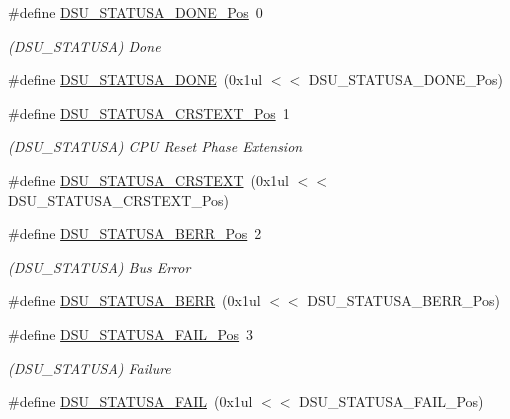\begin{DoxyCompactItemize}
\#define \mbox{\hyperlink{group___s_a_m_d21___d_s_u_ga608007c6aa3ae0221483e370d9ca999b}{D\+S\+U\+\_\+\+S\+T\+A\+T\+U\+S\+A\+\_\+\+D\+O\+N\+E\+\_\+\+Pos}}~0
\begin{DoxyCompactList}\small\item\em (D\+S\+U\+\_\+\+S\+T\+A\+T\+U\+SA) Done \end{DoxyCompactList}\item 
\#define \mbox{\hyperlink{group___s_a_m_d21___d_s_u_ga824b2ff5600830ebc7971da3eeea0b7b}{D\+S\+U\+\_\+\+S\+T\+A\+T\+U\+S\+A\+\_\+\+D\+O\+NE}}~(0x1ul $<$$<$ D\+S\+U\+\_\+\+S\+T\+A\+T\+U\+S\+A\+\_\+\+D\+O\+N\+E\+\_\+\+Pos)
\item 
\#define \mbox{\hyperlink{group___s_a_m_d21___d_s_u_gab5c6d644e1ec7f67cf2a9ad97a5262a2}{D\+S\+U\+\_\+\+S\+T\+A\+T\+U\+S\+A\+\_\+\+C\+R\+S\+T\+E\+X\+T\+\_\+\+Pos}}~1
\begin{DoxyCompactList}\small\item\em (D\+S\+U\+\_\+\+S\+T\+A\+T\+U\+SA) C\+PU Reset Phase Extension \end{DoxyCompactList}\item 
\#define \mbox{\hyperlink{group___s_a_m_d21___d_s_u_ga4ce5d24ab18ad2bf2cc5925d30432907}{D\+S\+U\+\_\+\+S\+T\+A\+T\+U\+S\+A\+\_\+\+C\+R\+S\+T\+E\+XT}}~(0x1ul $<$$<$ D\+S\+U\+\_\+\+S\+T\+A\+T\+U\+S\+A\+\_\+\+C\+R\+S\+T\+E\+X\+T\+\_\+\+Pos)
\item 
\#define \mbox{\hyperlink{group___s_a_m_d21___d_s_u_gafa02b78e838184c6f5a895f0f16c213a}{D\+S\+U\+\_\+\+S\+T\+A\+T\+U\+S\+A\+\_\+\+B\+E\+R\+R\+\_\+\+Pos}}~2
\begin{DoxyCompactList}\small\item\em (D\+S\+U\+\_\+\+S\+T\+A\+T\+U\+SA) Bus Error \end{DoxyCompactList}\item 
\#define \mbox{\hyperlink{group___s_a_m_d21___d_s_u_ga74dbd3779decac8f909b6f2fde2df451}{D\+S\+U\+\_\+\+S\+T\+A\+T\+U\+S\+A\+\_\+\+B\+E\+RR}}~(0x1ul $<$$<$ D\+S\+U\+\_\+\+S\+T\+A\+T\+U\+S\+A\+\_\+\+B\+E\+R\+R\+\_\+\+Pos)
\item 
\#define \mbox{\hyperlink{group___s_a_m_d21___d_s_u_ga379cd81ca596d64fff4cdf4cd0642e9d}{D\+S\+U\+\_\+\+S\+T\+A\+T\+U\+S\+A\+\_\+\+F\+A\+I\+L\+\_\+\+Pos}}~3
\begin{DoxyCompactList}\small\item\em (D\+S\+U\+\_\+\+S\+T\+A\+T\+U\+SA) Failure \end{DoxyCompactList}\item 
\#define \mbox{\hyperlink{group___s_a_m_d21___d_s_u_gacfa2c317afc818826c5ee60f7fd5b06a}{D\+S\+U\+\_\+\+S\+T\+A\+T\+U\+S\+A\+\_\+\+F\+A\+IL}}~(0x1ul $<$$<$ D\+S\+U\+\_\+\+S\+T\+A\+T\+U\+S\+A\+\_\+\+F\+A\+I\+L\+\_\+\+Pos)

\end{DoxyCompactItemize}

